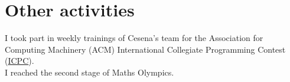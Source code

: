 \documentclass[curriculum-vitae-eng]{subfiles}
\begin{document}
	\section*{Other activities}
		 I took part in weekly trainings of Cesena's team for the Association for Computing Machinery (ACM) International Collegiate Programming Contest (\href{https://icpc.global}{ICPC}).\\

		 I reached the second stage of Maths Olympics.
	
\end{document}
